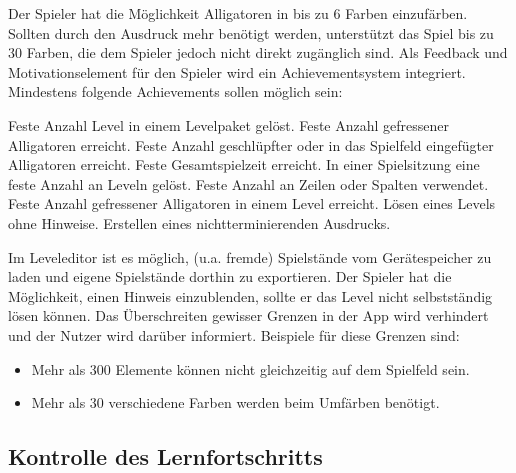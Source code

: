 \begin{requirements}
	 Der Spieler hat die Möglichkeit Alligatoren in bis zu 6 Farben einzufärben.
	Sollten durch den Ausdruck mehr benötigt werden, unterstützt das Spiel bis zu 30 Farben, die dem Spieler jedoch nicht direkt zugänglich sind.
	Als Feedback und Motivationselement für den Spieler wird ein Achievementsystem integriert.
	Mindestens folgende Achievements sollen möglich sein:
		\begin{requirements}
			 Feste Anzahl Level in einem Levelpaket gelöst.
			 Feste Anzahl gefressener Alligatoren erreicht.
			 Feste Anzahl geschlüpfter oder in das Spielfeld eingefügter Alligatoren erreicht.
			 Feste Gesamtspielzeit erreicht.
			 In einer Spielsitzung eine feste Anzahl an Leveln gelöst.
			 Feste Anzahl an Zeilen oder Spalten verwendet.
			 Feste Anzahl gefressener Alligatoren in einem Level erreicht.
			 Lösen eines Levels ohne Hinweise.
			 Erstellen eines nichtterminierenden Ausdrucks.
		\end{requirements}
	Im Leveleditor ist es möglich, (u.a. fremde) Spielstände vom Gerätespeicher zu laden und eigene Spielstände dorthin zu exportieren.
	 Der Spieler hat die Möglichkeit, einen Hinweis einzublenden, sollte er das Level nicht selbstständig lösen können.
	 Das Überschreiten gewisser Grenzen in der App wird verhindert und der Nutzer wird darüber informiert.
	Beispiele für diese Grenzen sind:
	\begin{itemize}
		\item Mehr als 300 Elemente können nicht gleichzeitig auf dem Spielfeld sein.
		\item Mehr als 30 verschiedene Farben werden beim Umfärben benötigt.
	\end{itemize}
\end{requirements}


\subsection{Kontrolle des Lernfortschritts}

